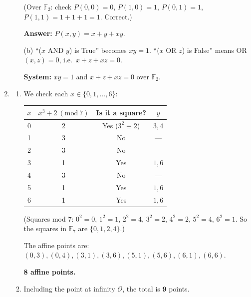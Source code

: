 \documentclass[12pt]{article}
\newcommand{\Mod}[1]{\ (\mathrm{mod}\ #1)}
\newcommand{\field}[1]{\mathbb{#1}}
\newcommand{\F}{\field{F}}
\begin{document}
\begin{enumerate}
\begin{enumerate}
  (Over $\F_2$: check $P(0,0)=0$, $P(1,0)=1$, $P(0,1)=1$, $P(1,1)=1+1+1=1$. Correct.)

  \textbf{Answer: }$P(x,y)=x+y+xy$.

  \item[(b)] ``($x$ AND $y$) is True'' becomes $xy=1$.
  ``($x$ OR $z$) is False'' means OR$(x,z)=0$, i.e.\ $x+z+xz=0$.

  \textbf{System:} $xy=1$ and $x+z+xz=0$ over $\F_2$.
\end{enumerate}

\item
\begin{enumerate}
  \item We check each $x\in\{0,1,\ldots,6\}$:

  \begin{tabular}{c|c|c|c}
  $x$ & $x^3+2\Mod{7}$ & Is it a square? & $y$ \\ \hline
  0 & 2 & Yes ($3^2\equiv 2$) & $3,4$ \\
  1 & 3 & No & --- \\
  2 & 3 & No & --- \\
  3 & 1 & Yes & $1,6$ \\
  4 & 3 & No & --- \\
  5 & 1 & Yes & $1,6$ \\
  6 & 1 & Yes & $1,6$
  \end{tabular}

  (Squares mod $7$: $0^2=0$, $1^2=1$, $2^2=4$, $3^2=2$, $4^2=2$, $5^2=4$, $6^2=1$. So the squares in $\F_7$ are $\{0,1,2,4\}$.)

  The affine points are: $(0,3),(0,4),(3,1),(3,6),(5,1),(5,6),(6,1),(6,6)$.

  \textbf{8 affine points.}

  \item Including the point at infinity $\mathcal{O}$, the total is $\mathbf{9}$ points.
\end{enumerate}

\end{enumerate}
\end{document}
